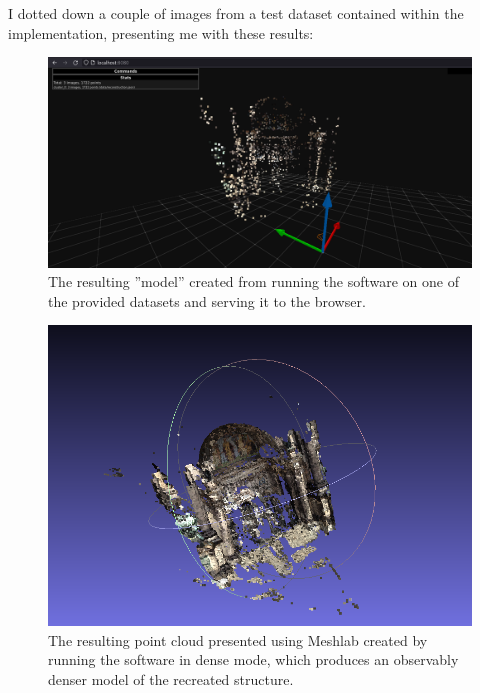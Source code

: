 \documentclass[a4paper, titlepage,12pt]{article}
\begin{document}
	I dotted down a couple of images from a test dataset contained within the implementation, presenting me with these results:

\begin{figure}[H]
	\begin{center}
		\includegraphics[scale=0.4]{./sfm_webview.png}
		\caption{The resulting ''model'' created from running the software on one of the provided datasets and serving it to the browser.}
	\end{center}
\end{figure}

\begin{figure}[H]
	\begin{center}
		\includegraphics[scale=0.5]{./sfm_meshlab.png}
		\caption{The resulting point cloud presented using Meshlab created by running the software in dense mode, which produces an observably denser model of the recreated structure.}
	\end{center}
\end{figure}
\end{document}

